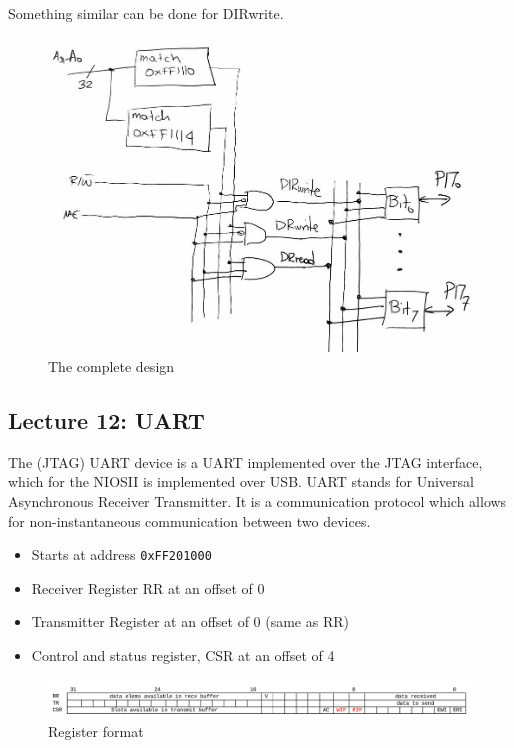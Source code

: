 \documentclass[../notes.tex]{subfiles}
\begin{document}
Something similar can be done for DIRwrite.

\begin{figure}[H]
	\centering
	\includegraphics[width=0.8\linewidth]{img/image_2022-10-16-00-58-42.png}
	\caption{The complete design}
\end{figure}


\subsection{Lecture 12: UART}

The (JTAG) UART device is a UART implemented over the JTAG interface, which for the NIOSII is implemented over USB. 
UART stands for Universal Asynchronous Receiver Transmitter. It is a communication protocol which allows for non-instantaneous communication between two devices.


\begin{itemize}
	\item Starts at address \texttt{0xFF201000}
	\item Receiver Register RR at an offset of 0
	\item Transmitter Register at an offset of 0 (same as RR)
	\item Control and status register, CSR at an offset of 4
\end{itemize}

\begin{figure}[H]
	\centering
	\includegraphics[width=0.8\linewidth]{img/image_2022-10-16-01-58-27.png}
	\caption{Register format}
\end{figure}
\end{document}
